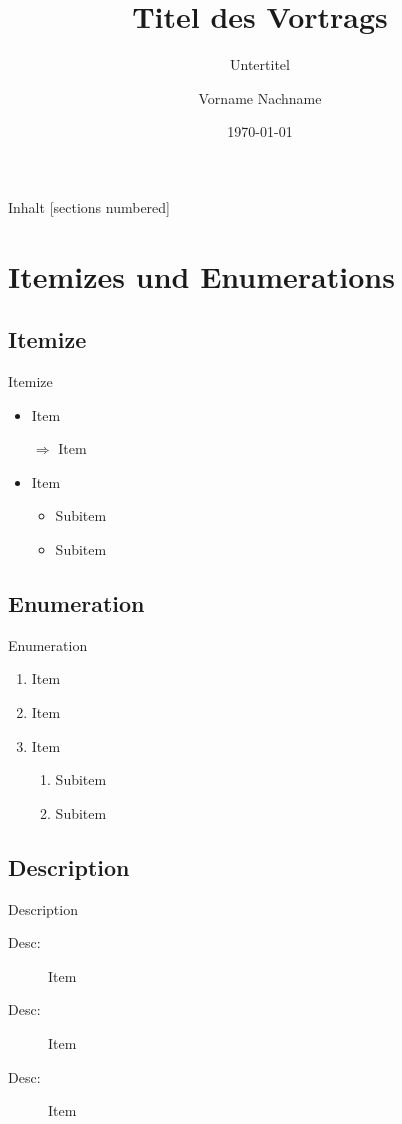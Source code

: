 \documentclass[8pt,xcolor={dvipsnames},aspectratio=169]{beamer}
\date{\today} %
\title{Titel des Vortrags}
\subtitle{Untertitel}
\author[V. Nachname]{Vorname Nachname}
\institute{Miscatonic University\\Arkham, MA\\Faculty for the occult} %
\begin{document}
\frame{\maketitle} %
\begin{frame}{Inhalt} 
  [sections numbered]
\tableofcontents[hideallsubsections]
\end{frame}
\section{Itemizes und Enumerations}
\subsection{Itemize}
\begin{frame}{Itemize}    
    \begin{itemize}
        \item Item
        \item[$\Rightarrow$] Item
        \item Item
            \begin{itemize}
                \item Subitem
                \item Subitem
            \end{itemize}
    \end{itemize}
\end{frame}
\subsection{Enumeration}
\begin{frame}{Enumeration}    
    \begin{enumerate}
        \item Item
        \item Item
        \item Item 
            \begin{enumerate}
                \item Subitem
                \item Subitem
            \end{enumerate}
    \end{enumerate}
\end{frame}
\subsection{Description}
\begin{frame}{Description}    
    \begin{description}
        \item[Desc:] Item
        \item[Desc:] Item
        \item[Desc:] Item 
    \end{description}
\end{frame}
\end{document}

